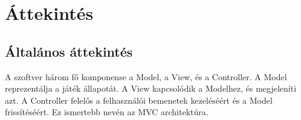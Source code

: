 \section{Áttekintés}
\subsection{Általános áttekintés}
A szoftver három fő komponense a Model, a View, és a Controller. A Model reprezentálja a játék állapotát. A View kapcsolódik a Modelhez, és megjeleníti azt. A Controller felelős a felhasználói bemenetek kezeléséért és a Model frissítéséért. Ez ismertebb nevén az MVC architektúra.

